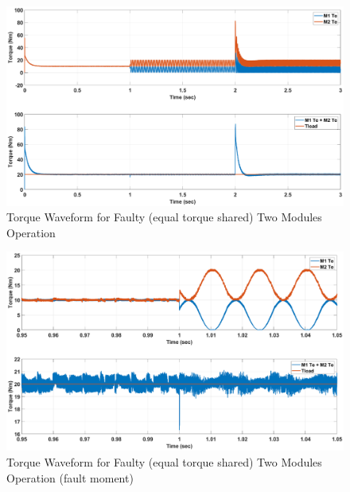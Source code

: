 \documentclass{article}
\begin{document}
\begin{figure}[h!]
\centering
\includegraphics[scale=0.35]{SimulationResults/two_modules/faulty_torqueshared/tref_tload.eps}
\caption{Torque Waveform for Faulty (equal torque shared) Two Modules Operation}
\label{fig:TorqueTwoModulesFaultyEqualTorque}
\end{figure}

\begin{figure}[h!]
\centering
\includegraphics[scale=0.35]{SimulationResults/two_modules/faulty_torqueshared/tref_tload_close.eps}
\caption{Torque Waveform for Faulty (equal torque shared) Two Modules Operation (fault moment)}
\label{fig:TorqueTwoModulesFaultyEqualTorqueClose}
\end{figure}
\end{document}

